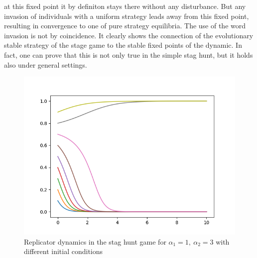 \documentclass[11pt]{article}
\begin{document}
 at this fixed point it by definiton stays there without any disturbance. 
 But any invasion of individuals with a uniform strategy leads away from
 this fixed point, resulting in convergence to one of pure strategy equilibria.
 The use of the word invasion is not by coincidence. It clearly shows the 
 connection of the evolutionary stable strategy of the stage game to the 
 stable fixed points of the dynamic. In fact, one can prove that this is not
 only true in the simple stag hunt, but it holds also under general settings.
\begin{figure}
        \centering
        \includegraphics[scale=0.5]{basinofattraction.png}
        \caption{Replicator dynamics in the stag hunt game for 
                $\alpha_1=1,\ \alpha_2=3$ with different initial conditions}
                \label{fig:basinofattraction}
\end{figure}
\end{document}
